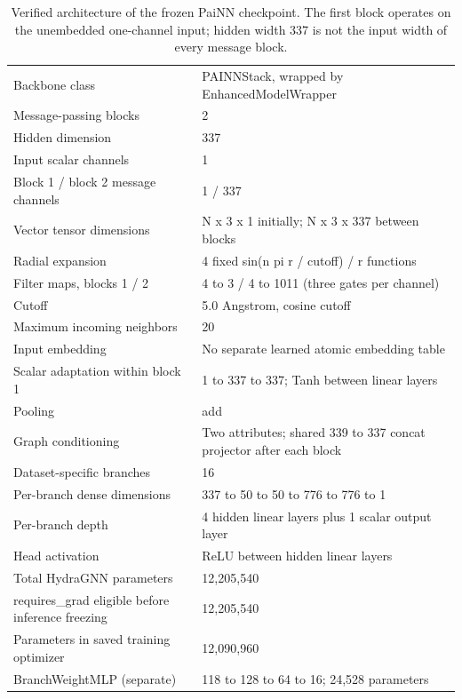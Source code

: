\begin{table}[t]
\centering
\small
\caption{Verified architecture of the frozen PaiNN checkpoint. The first block operates on the unembedded one-channel input; hidden width 337 is not the input width of every message block.}
\label{tab:painn-verified-architecture}
\begin{tabular}{p{}p{}}
\hline
Backbone class & PAINNStack, wrapped by EnhancedModelWrapper \\
Message-passing blocks & 2 \\
Hidden dimension & 337 \\
Input scalar channels & 1 \\
Block 1 / block 2 message channels & 1 / 337 \\
Vector tensor dimensions & N x 3 x 1 initially; N x 3 x 337 between blocks \\
Radial expansion & 4 fixed sin(n pi r / cutoff) / r functions \\
Filter maps, blocks 1 / 2 & 4 to 3 / 4 to 1011 (three gates per channel) \\
Cutoff & 5.0 Angstrom, cosine cutoff \\
Maximum incoming neighbors & 20 \\
Input embedding & No separate learned atomic embedding table \\
Scalar adaptation within block 1 & 1 to 337 to 337; Tanh between linear layers \\
Pooling & add \\
Graph conditioning & Two attributes; shared 339 to 337 concat projector after each block \\
Dataset-specific branches & 16 \\
Per-branch dense dimensions & 337 to 50 to 50 to 776 to 776 to 1 \\
Per-branch depth & 4 hidden linear layers plus 1 scalar output layer \\
Head activation & ReLU between hidden linear layers \\
Total HydraGNN parameters & 12,205,540 \\
requires\_grad eligible before inference freezing & 12,205,540 \\
Parameters in saved training optimizer & 12,090,960 \\
BranchWeightMLP (separate) & 118 to 128 to 64 to 16; 24,528 parameters \\
\hline
\end{tabular}
\end{table}

